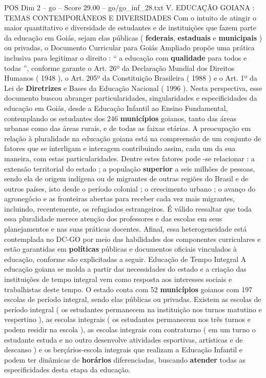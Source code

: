 \begin{textsample}{POS Dim 2 – go – Score 29.00 – go/go\_inf\_28.txt}  \label{ex:f2_pos_173}
V.
EDUCAÇÃO GOIANA : TEMAS CONTEMPORÂNEOS E DIVERSIDADES Com o intuito de atingir o maior quantitativo e diversidade de estudantes e de instituições que fazem parte da educação em Goiás, sejam elas públicas ( \textbf{federais}, \textbf{estaduais} e \textbf{municipais} ) ou privadas, o Documento Curricular para Goiás Ampliado propõe uma prática inclusiva para legitimar o direito : “ a educação com \textbf{qualidade} para todos e todas ”, conforme garante o Art. 26º da Declaração Mundial dos Direitos Humanos ( 1948 ), o Art. 205º da Constituição Brasileira ( 1988 ) e o Art. 1º da Lei de \textbf{Diretrizes} e Bases da Educação Nacional ( 1996 ).
Nesta perspectiva, esse documento buscou abranger particularidades, singularidades e especificidades da educação em Goiás, desde a Educação Infantil ao Ensino Fundamental, contemplando os estudantes dos 246 \textbf{municípios} goianos, tanto das áreas urbanas como das áreas rurais, e de todas as faixas etárias.
A preocupação em relação à pluralidade na educação goiana está na compreensão de um conjunto de fatores que se interligam e interagem contribuindo assim, cada um da sua maneira, com estas particularidades.
Dentre estes fatores pode -se relacionar : a extensão territorial do estado ; a população \textbf{superior} a seis milhões de pessoas, sendo ela de origem indígena ou de migrantes de outras regiões do Brasil e de outros países, isto desde o período colonial ; o crescimento urbano ; o avanço do agronegócio e as fronteiras abertas para receber cada vez mais migrantes, incluindo, recentemente, os refugiados estrangeiros.
É válido ressaltar que toda essa pluralidade merece atenção dos professores e das escolas em seus planejamentos e nas suas práticas docentes.
Afinal, essa heterogeneidade está contemplada no DC-GO por meio das habilidades dos componentes curriculares e estão garantidas em \textbf{políticas} públicas e documentos oficiais vinculados à educação, conforme são explicitadas a seguir.
Educação de Tempo Integral A educação goiana se molda a partir das necessidades do estado e a criação das instituições de tempo integral vem como resposta aos interesses sociais e trabalhistas deste tempo.
O estado conta com 52 \textbf{municípios} goianos com 197 escolas de período integral, sendo elas públicas ou privadas.
Existem as escolas de período integral ( os estudantes permanecem na instituição nos turnos matutino e vespertino ), as escolas integrais ( os estudantes permanecem nos três turnos e podem residir na escola ), as escolas integrais com contraturno ( em um turno o estudante estuda e no outro desenvolve atividades esportivas, artísticas e de descanso ) e os berçários-escola integrais que realizam a Educação Infantil e podem ter dinâmicas de \textbf{horários} diferenciadas, buscando \textbf{atender} todas as especificidades desta etapa da educação.

\end{textsample}
